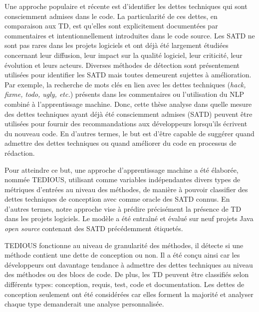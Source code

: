 Une approche populaire et r\'{e}cente est d'identifier les dettes techniques qui sont consciemment admises dans le code. La particularit\'{e} de ces dettes, en comparaison aux \ac{TD}, est qu'elles sont explicitement document\'{e}es par commentaires et intentionnellement introduites dans le code source. Les \ac{SATD} ne sont pas rares dans les projets logiciels et ont d\'{e}j\`{a} \'{e}t\'{e} largement \'{e}tudi\'{e}es concernant leur diffusion, leur impact sur la qualit\'{e} logiciel, leur criticit\'{e}, leur \'{e}volution et leurs acteurs. Diverses m\'{e}thodes de d\'{e}tection sont pr\'{e}sentement utilis\'{e}es pour identifier les \ac{SATD} mais toutes demeurent sujettes \`{a} am\'{e}lioration. Par exemple, la recherche de mots cl\'{e}s en lien avec les dettes techniques (\emph{hack, fixme, todo, ugly, etc.}) pr\'{e}sents dans les commentaires ou l'utilisation du \ac{NLP} combin\'{e} \`{a} l'apprentissage machine. Donc, cette th\`{e}se analyse dans quelle mesure des dettes techniques ayant d\'{e}j\`{a} \'{e}t\'{e} consciemment admises (\ac{SATD}) peuvent \^{e}tre utilis\'{e}es pour fournir des recommandations aux d\'{e}veloppeurs lorsqu'ils \'{e}crivent du nouveau code. En d'autres termes, le but est d'\^{e}tre capable de sugg\'{e}rer quand admettre des dettes techniques ou quand am\'{e}liorer du code en processus de r\'{e}daction. \par

Pour atteindre ce but, une approche d'apprentissage machine a \'{e}t\'{e} \'{e}labor\'{e}e, nomm\'{e}e \ac{TEDIOUS}, utilisant comme variables ind\'{e}pendantes divers types de m\'{e}triques d'entr\'{e}es au niveau des m\'{e}thodes, de mani\`{e}re \`{a} pouvoir classifier des dettes techniques de conception avec comme oracle des \ac{SATD} connus. En d'autres termes, notre approche vise \`{a} pr\'{e}dire pr\'{e}cis\'{e}ment la pr\'{e}sence de \ac{TD} dans les projets logiciels. Le mod\`{e}le a \'{e}t\'{e} entra\^{i}n\'{e} et \'{e}valu\'{e} sur neuf projets Java \emph{open source} contenant des \ac{SATD} pr\'{e}c\'{e}demment \'{e}tiquet\'{e}s. \par

\ac{TEDIOUS} fonctionne au niveau de granularit\'{e} des m\'{e}thodes, il d\'{e}tecte si une m\'{e}thode contient une dette de conception ou non. Il a \'{e}t\'{e} con\c{c}u ainsi car les d\'{e}veloppeurs ont davantage tendance \`{a} admettre des dettes techniques au niveau des m\'{e}thodes ou des blocs de code. De plus, les \ac{TD} peuvent \^{e}tre classifi\'{e}s selon diff\'{e}rents types: conception, requis, test, code et documentation. Les dettes de conception seulement ont \'{e}t\'{e} consid\'{e}r\'{e}es car elles forment la majorit\'{e} et analyser chaque type demanderait une analyse personnalis\'{e}e. \par

